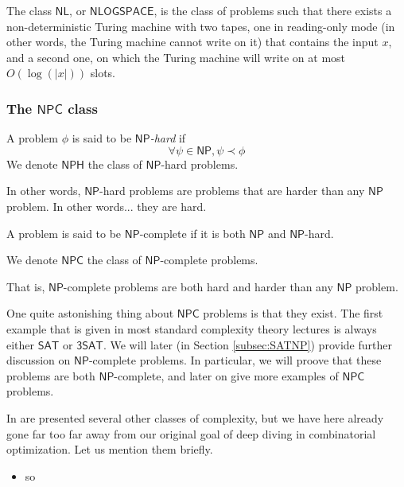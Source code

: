 \begin{definition}[$ \mathsf NL $]
    The class $ \mathsf{NL} $, or $ \mathsf{NLOGSPACE} $, is the class of problems such that there exists a non-deterministic Turing machine with two tapes, one in \og reading-only \fg mode (in other words, the Turing machine cannot write on it) that contains the input $ x $, and a second one, on which the Turing machine will write on at most $ O(\log(|x|)) $ slots.
\end{definition}

\subsubsection{The $ \mathsf{NPC} $ class}

\begin{definition}
    A problem $ \phi $ is said to be \textit{$ \mathsf{NP} $-hard} if
    \[
        \forall \psi \in \mathsf{NP}, \psi \prec \phi
    \]
    We denote $ \mathsf{NPH} $ the class of $ \mathsf{NP} $-hard problems.
\end{definition}

In other words, $ \mathsf{NP} $-hard problems are problems that are harder than any $ \mathsf{NP} $ problem. In other words... they are hard.

\begin{definition}
    A problem is said to be $ \mathsf{NP} $-complete if it is both $ \mathsf{NP} $ and $ \mathsf{NP} $-hard.

    We denote $ \mathsf{NPC} $ the class of $ \mathsf{NP} $-complete problems.
\end{definition}

That is, $ \mathsf{NP} $-complete problems are both hard and harder than any $ \mathsf{NP} $ problem. 

One quite astonishing thing about $ \mathsf{NPC} $ problems is that they exist. The first example that is given in most standard complexity theory lectures is always either $ \mathsf{SAT} $ or $ \mathsf{3SAT} $. We will later (in Section \ref{subsec:SATNP}) provide further discussion on $ \mathsf{NP} $-complete problems. In particular, we will proove that these problems are both $ \mathsf{NP} $-complete, and later on give more examples of $ \mathsf{NPC} $ problems.

\begin{remark}
    In \cite{gowers2024} are presented several other classes of complexity, but we have here already gone far too far away from our original goal of deep diving in combinatorial optimization. Let us mention them briefly.
    \begin{itemize}
        \item so
    \end{itemize}
\end{remark}


